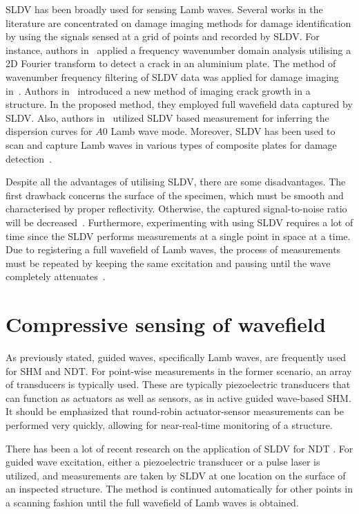 SLDV has been broadly used for sensing Lamb waves. 
Several works in the literature are concentrated on damage imaging methods for damage identification by using the signals sensed at a grid of points and recorded by SLDV.
For instance, authors in~\cite{Yu2013} applied a frequency wavenumber domain analysis utilising a 2D Fourier transform to detect a crack in an aluminium plate. 
The method of wavenumber frequency filtering of SLDV data was applied for damage imaging in~\cite{Ruzzene2007}. 
Authors in~\cite{Kudela2015} introduced a new method of imaging crack growth in a structure.
In the proposed method, they employed full wavefield data captured by SLDV.
Also, authors in~\cite{Harb2015} utilized SLDV based measurement for inferring the dispersion curves for \(A0\) Lamb wave mode. 
Moreover, SLDV has been used to scan and capture Lamb waves in various types of composite plates for damage detection~\cite{Lamboul2013, Radzienski2019,Sohn2011, An2016,Rogge2013, Tian2015}.

Despite all the advantages of utilising SLDV, there are some disadvantages.
The first drawback concerns the surface of the specimen, which must be smooth and characterised by proper reflectivity. 
Otherwise, the captured signal-to-noise ratio will be decreased~\cite{Ostachowicz2014}. 
Furthermore, experimenting with using SLDV requires a lot of time since the SLDV performs measurements at a single point in space at a time.
Due to registering a full wavefield of Lamb waves, the process of measurements must be repeated by keeping the same excitation and pausing until the wave completely attenuates~\cite{Ostachowicz2014}.
\section{Compressive sensing of wavefield}
\label{CS}
As previously stated, guided waves, specifically Lamb waves, are frequently used for SHM and NDT.
For point-wise measurements in the former scenario, an array of transducers is typically used.
These are typically piezoelectric transducers that can function as actuators as well as sensors, as in active guided wave-based SHM.
It should be emphasized that round-robin actuator-sensor measurements can be performed very quickly, allowing for near-real-time monitoring of a structure.

There has been a lot of recent research on the application of SLDV for NDT \cite{Flynn2013,Kudela2015,Kudela2018d,Segers2021,Segers2022}.
For guided wave excitation, either a piezoelectric transducer or a pulse laser is utilized, and measurements are taken by SLDV at one location on the surface of an inspected structure.
The method is continued automatically for other points in a scanning fashion until the full wavefield of Lamb waves is obtained.

